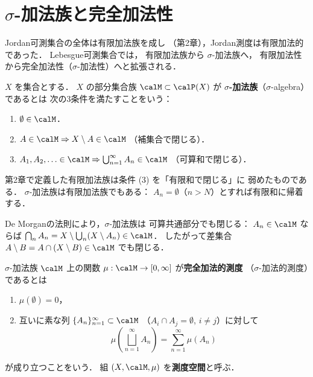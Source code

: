 \section{\texorpdfstring{$\sigma$}{σ}-加法族と完全加法性}
\label{sec:sigma-algebra}

Jordan可測集合の全体は有限加法族を成し
（第2章），Jordan測度は有限加法的であった．
Lebesgue可測集合では，
有限加法族から $\sigma$-加法族へ，
有限加法性から完全加法性（$\sigma$-加法性）へと拡張される．

\begin{definition}\label{def:sigma-algebra}
$X$ を集合とする．
$X$ の部分集合族 $\calM \subset \calP(X)$ が
\textbf{$\sigma$-加法族}（$\sigma$-algebra）であるとは
次の3条件を満たすことをいう：
\begin{enumerate}
\item $\emptyset \in \calM$．
\item $A \in \calM \Rightarrow X \setminus A \in \calM$
\quad（補集合で閉じる）．
\item $A_1, A_2, \ldots \in \calM
\Rightarrow \bigcup_{n=1}^{\infty} A_n \in \calM$
\quad（可算和で閉じる）．
\end{enumerate}
\end{definition}

\begin{remark}
第2章で定義した有限加法族は条件 (3) を「有限和で閉じる」に
弱めたものである．
$\sigma$-加法族は有限加法族でもある：
$A_{n} = \emptyset$（$n > N$）とすれば有限和に帰着する．

De Morganの法則により，$\sigma$-加法族は
可算共通部分でも閉じる：
$A_n \in \calM$ ならば
$\bigcap_n A_n = X \setminus \bigcup_n (X \setminus A_n) \in \calM$．
したがって差集合 $A \setminus B = A \cap (X \setminus B) \in \calM$ でも閉じる．
\end{remark}

\begin{definition}[完全加法的測度]\label{def:countably-additive-measure}
$\sigma$-加法族 $\calM$ 上の関数
$\mu : \calM \to [0,\infty]$ が\textbf{完全加法的測度}
（$\sigma$-加法的測度）であるとは
\begin{enumerate}
\item $\mu(\emptyset) = 0$，
\item 互いに素な列 $\{A_n\}_{n=1}^{\infty} \subset \calM$
（$A_i \cap A_j = \emptyset$, $i \neq j$）に対して
\[
\mu\!\left(\bigsqcup_{n=1}^{\infty} A_n\right)
= \sum_{n=1}^{\infty} \mu(A_n)
\]
\end{enumerate}
が成り立つことをいう．
組 $(X, \calM, \mu)$ を\textbf{測度空間}と呼ぶ．
\end{definition}

